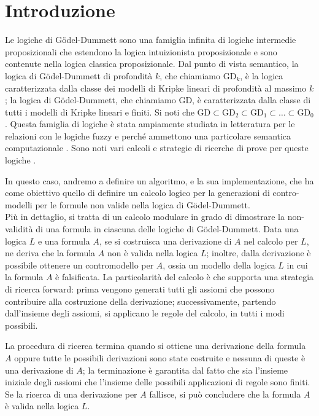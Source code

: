 \documentclass[\main/tesi.tex]{subfiles}
\begin{document}
\chapter{Introduzione}

Le logiche di G\"odel-Dummett sono una famiglia infinita di logiche
intermedie proposizionali che estendono la logica intuizionista
proposizionale
e sono contenute nella logica classica proposizionale.
Dal punto di vista semantico, la logica di  G\"odel-Dummett di profondit\`a
$k$,
che chiamiamo $\mathrm{GD}_k$,
\`e la logica caratterizzata dalla classe dei modelli di Kripke lineari
di profondit\`a
al massimo $k$; la logica di  G\"odel-Dummett,  che chiamiamo $\mathrm{GD}$,
\`e caratterizzata dalla classe di tutti i  modelli di Kripke lineari e finiti.
Si noti che $\mathrm{GD}\subset\mathrm{GD}_2
  \subset\mathrm{GD}_1\subset\dots\subset \mathrm{GD}_0$.
Questa famiglia di logiche \`e stata ampiamente studiata in letteratura
per le relazioni con le logiche
fuzzy \cite{Hajek:98} e perch\'e ammettono una particolare semantica computazionale
\cite{AscCiaGen:2017,Avron:91b}.
Sono noti vari calcoli e strategie di ricerche di prove per queste logiche \cite{Aschieri:2016,Avron:91b,BecPre:2018,FioFer:2020,Fiorino:2014,LarcheyWendling:2005}.

In questo caso, andremo a definire un algoritmo, e la sua implementazione, che ha come obiettivo quello di definire un calcolo logico per la generazioni di contro-modelli per le formule non valide nella logica di G\"odel-Dummett.\\
Pi\`u in dettaglio,
si tratta di un calcolo modulare in grado di dimostrare
la non-validit\`a di una formula in ciascuna delle logiche di
G\"odel-Dummett.
Data una logica $L$ e una formula $A$, se si costruisca una derivazione
di $A$ nel calcolo per $L$,
ne deriva che la formula $A$ non \`e valida nella logica $L$;
inoltre, dalla derivazione \`e possibile ottenere un contromodello per
$A$, ossia un modello
della logica $L$ in cui la formula $A$ \`e falsificata.
La particolarit\`a del calcolo \`e che supporta una strategia di ricerca
forward: prima vengono
generati tutti gli assiomi che possono contribuire alla costruzione
della derivazione;
successivamente, partendo dall'insieme degli assiomi, si applicano le
regole del calcolo, in tutti i modi possibili.

La procedura di ricerca termina quando si ottiene una derivazione della
formula $A$ oppure tutte le possibili derivazioni sono state costruite
e nessuna di queste \`e una derivazione di $A$; la terminazione \`e
garantita
dal fatto che sia l'insieme iniziale degli assiomi che l'insieme delle
possibili applicazioni di regole sono finiti.
Se la ricerca di una derivazione per $A$ fallisce,
si pu\`o concludere che la formula $A$ \`e valida nella logica $L$.
\end{document}
